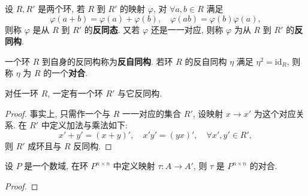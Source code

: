 \documentclass[../../main.tex]{subfiles}%
\begin{document}
\begin{definition}
设 \( R, R' \) 是两个环, 若 \( R \) 到 \( R' \) 的映射 \( \varphi \), 对 \( \forall a,b \in R \) 满足
\[
\varphi(a + b) = \varphi(a) + \varphi(b), \quad \varphi(ab) = \varphi(b)\varphi(a),
\]
则称 \( \varphi \) 是从 \( R \) 到 \( R' \) 的\textbf{反同态}. 又若 \( \varphi \) 还是一一对应, 则称 \( \varphi \) 为从 \( R \) 到 \( R' \) 的\textbf{反同构}.

一个环 \( R \) 到自身的反同构称为\textbf{反自同构}. 若环 \( R \) 的反自同构 \( \eta \) 满足 \( \eta^2 = \text{id}_R \), 则称 \( \eta \) 为 \( R \) 的一个\textbf{对合}.
\end{definition}

\begin{theorem}
对任一环 \( R \), 一定有一个环 \( R' \) 与它反同构.
\end{theorem}
\begin{proof}

事实上, 只需作一个与 \( R \) 一一对应的集合 \( R' \), 设映射 \( x \to x' \) 为这个对应关系. 在 \( R' \) 中定义加法与乘法如下:
\[
x' + y' = (x + y)', \quad x'y' = (yx)', \quad \forall x', y' \in R',
\]
则 \( R' \) 成环且与 \( R \) 反同构.

\end{proof}

\begin{example}
设 \( P \) 是一个数域, 在环 \( P^{n \times n} \) 中定义映射 \( \tau: A \to A' \), 则 \( \tau \) 是 \( P^{n \times n} \) 的对合.
\end{example}
\begin{proof}



\end{proof}
\end{document}
